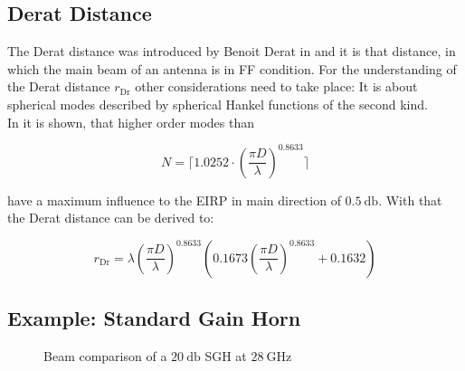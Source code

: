 \subsection{Derat Distance}

The Derat distance was introduced by Benoit Derat in \cite{8393926} and it is that distance, in which the main beam of an antenna is in \ac{FF} condition. For the understanding of the Derat distance $r_{\text{Dr}}$ other considerations need to take place: It is about spherical modes described by spherical Hankel functions  of the second kind. \cite{8393926} \cite{hansen}\\
In \cite{8393926} it is shown, that higher order modes than 

\begin{equation}
N = \lceil 1.0252\cdot\left(\frac{\pi D}{\lambda}\right)^{0.8633} \rceil
\end{equation}

have a maximum influence to the \ac{EIRP} in main direction of $\SI{0.5}{\decibel}$. With that the Derat distance can be derived to:

\begin{equation}
r_{\text{Dr}} = \lambda\left(\frac{\pi D}{\lambda}\right)^{0.8633}\left(0.1673\left(\frac{\pi D}{\lambda}\right)^{0.8633}+0.1632\right)
\end{equation}

\subsection{Example: Standard Gain Horn}

\begin{figure}[H]
\centering
  \centering
  \centering
  \centering
\caption{Beam comparison of a $\SI{20}{\decibel}$ SGH at $\SI{28}{\giga\hertz}$}
\label{fig:beamcpmp}
\end{figure}

